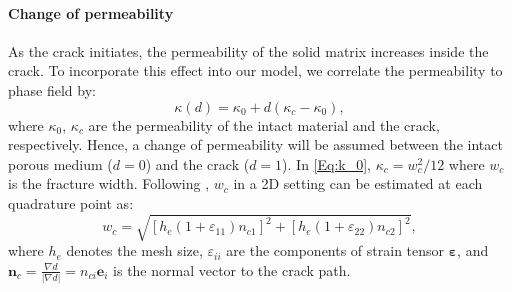 \paragraph{Change of permeability} As the crack initiates, the permeability of the solid matrix increases inside the crack. To incorporate this effect into our model, 
we correlate the permeability to phase field by:
\begin{equation} \label{Eq:k_0}
\kappa(d)=\kappa_0+d\left(\kappa_c-\kappa_0 \right),
\end{equation}
where $\kappa_0$, $\kappa_c$ are the permeability of the intact material and the crack, respectively. Hence, a change of permeability will be assumed between the intact porous medium ($d=0$) and the crack ($d=1$). In \eqref{Eq:k_0}, $\kappa_c={w_c^2}/{12}$ where $w_c$ is the fracture width. 
Following \cite{heider2018modeling}, $w_c$ in a 2D setting can be estimated at each quadrature point as:
\begin{equation*}
w_c=\sqrt{\left[h_e\left(1+\varepsilon_{11}\right)n_{c1}\right]^2+\left[h_e\left(1+\varepsilon_{22}\right)n_{c2}\right]^2},
\end{equation*}
where $h_e$ denotes the mesh size, $\varepsilon_{ii}$ are the components of strain tensor $\bm{\varepsilon}$, and $\bm{n}_c=\frac{\nabla d}{|\nabla d|}=n_{ci}\bm{e}_i$ is the normal vector to the crack path.

